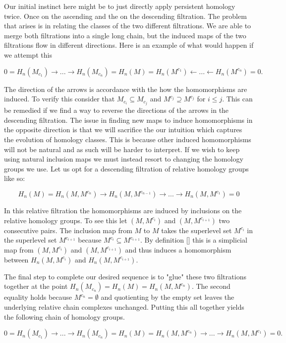 Our initial instinct here might be to just directly apply persistent homology twice. Once on the ascending and the on the descending filtration. The problem that arises is in relating the classes of the two different filtrations. We are able to merge both filtrations into a single long chain, but the induced maps of the two filtrations flow in different directions. Here is an example of what would happen if we attempt this

$$ 0 = H_n(M_{c_1}) \rightarrow ... \rightarrow H_n(M_{c_n}) = H_n(M) = H_n(M^{c_1}) \leftarrow ... \leftarrow H_n(M^{c_{n}}) = 0.$$

The direction of the arrows is accordance with the how the homomorphisms are induced. To verify this consider that $M_{c_i} \subseteq M_{c_j}$ and $M^{c_j} \supseteq M^{c_j}$ for $i \le j$. This can be remedied if we find a way to reverse the directions of the arrows in the descending filtration. The issue in finding new maps to induce homomorphisms in the opposite direction is that we will sacrifice the our intuition which captures the evolution of homology classes. This is because other induced homomorphisms will not be natural and as such will be harder to interpret. If we wish to keep using natural inclusion maps we must instead resort to changing the homology groups we use. Let us opt for a descending filtration of relative homology groups like so:

$$ H_n(M) = H_n(M, M^{c_n}) \rightarrow H_n(M, M^{c_{n - 1}}) \rightarrow ... \rightarrow H_n(M, M^{c_{1}}) = 0 $$


In this relative filtration the homomorphisms are induced by inclusions on the relative homology groups. To see this let $(M, M^{c_i})$ and $(M, M^{c_{i+1}})$ two consecutive pairs. The inclusion map from $M$ to $M$ takes the superlevel set $M^{c_i}$ in the superlevel set $M^{c_{i+1}}$ because $M^{c_i} \subseteq M^{c_{i+1}}$. By definition [] this is a simplicial map from $(M, M^{c_i})$ and $(M, M^{c_{i+1}})$ and thus induces a homomorphism between $H_n(M, M^{c_i})$ and $H_n(M, M^{c_{i+1}})$.

The final step to complete our desired sequence is to "glue" these two filtrations together at the point $ H_n(M_{c_n}) = H_n(M) = H_n(M, M^{c_n})$. The second equality holds because $M^{c_n} = \emptyset$ and quotienting by the empty set leaves the underlying relative chain complexes unchanged. Putting this all together yields the following chain of homology groups.

$$ 0 = H_n(M_{c_1}) \rightarrow ... \rightarrow H_n(M_{c_n}) = H_n(M) = H_n(M, M^{c_n}) \rightarrow ... \rightarrow H_n(M, M^{c_{1}}) = 0.$$


